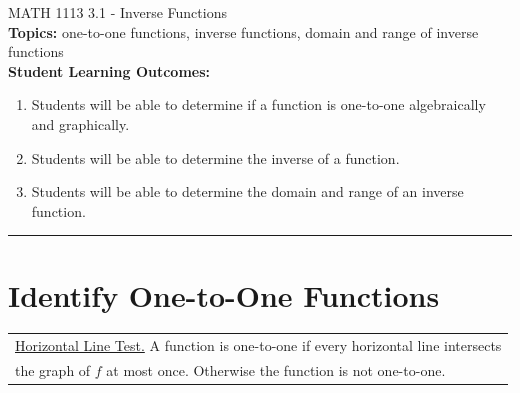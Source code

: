 \documentclass[11pt]{article}
\begin{document}
\noindent MATH 1113   \hfill 3.1 - Inverse Functions\\



\noindent \textbf{Topics:}  one-to-one functions, inverse functions, domain and range of inverse functions\\

\noindent \textbf{Student Learning Outcomes:}
\begin{enumerate}
\item Students will be able to determine if a function is one-to-one algebraically and graphically.
\item Students will be able to determine the inverse of a function.
\item Students will be able to determine the domain and range of an inverse function.
\end{enumerate}

\hrule 
\vspace{5mm}
\section{Identify One-to-One Functions}


\noindent \begin{tabular}{ | l  |} \hline
\noindent \underline{Horizontal Line Test.} A function is one-to-one if every horizontal line intersects \\ the graph of $f$ at most once. Otherwise the function is not one-to-one. \\  \hline
\end{tabular} 
\end{document}
